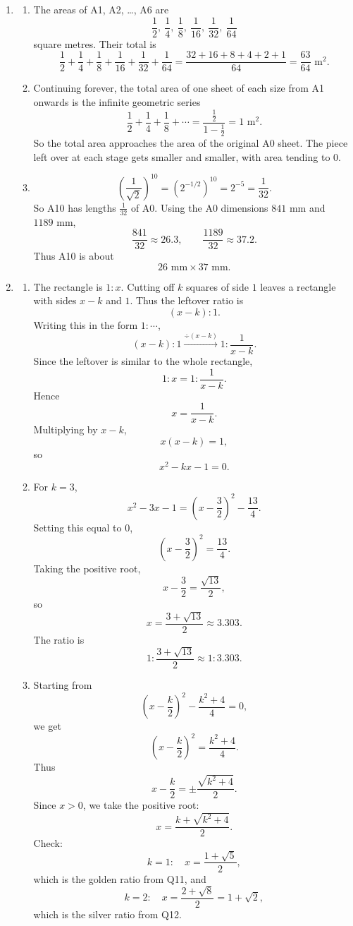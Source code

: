 \documentclass[11pt,a4paper]{article}
\begin{document}
\begin{enumerate}[label=\textbf{Q\arabic*.}, leftmargin=*, itemsep=1.2em]
\item
\begin{enumerate}[label=(\alph*)]
\item The areas of A1, A2, \ldots, A6 are
\[
\frac12,\ \frac14,\ \frac18,\ \frac1{16},\ \frac1{32},\ \frac1{64}
\]
square metres. Their total is
\[
\frac12+\frac14+\frac18+\frac1{16}+\frac1{32}+\frac1{64}
=
\frac{32+16+8+4+2+1}{64}
=
\frac{63}{64}\text{ m}^2.
\]

\item Continuing forever, the total area of one sheet of each size from A1 onwards is the infinite geometric series
\[
\frac12+\frac14+\frac18+\cdots
=
\frac{\frac12}{1-\frac12}
=1\text{ m}^2.
\]
So the total area approaches the area of the original A0 sheet. The piece left over at each stage gets smaller and smaller, with area tending to \(0\).

\item
\[
\left(\frac1{\sqrt2}\right)^{10}
=
\left(2^{-1/2}\right)^{10}
=
2^{-5}
=
\frac1{32}.
\]
So A10 has lengths \(\frac1{32}\) of A0. Using the A0 dimensions \(841\text{ mm}\) and \(1189\text{ mm}\),
\[
\frac{841}{32}\approx 26.3,
\qquad
\frac{1189}{32}\approx 37.2.
\]
Thus A10 is about
\[
26\text{ mm}\times 37\text{ mm}.
\]
\end{enumerate}

\item
\begin{enumerate}[label=(\alph*)]
\item The rectangle is \(1:x\). Cutting off \(k\) squares of side \(1\) leaves a rectangle with sides \(x-k\) and \(1\). Thus the leftover ratio is
\[
(x-k):1.
\]
Writing this in the form \(1:\cdots\),
\[
(x-k):1\xrightarrow{\div (x-k)}1:\frac1{x-k}.
\]
Since the leftover is similar to the whole rectangle,
\[
1:x=1:\frac1{x-k}.
\]
Hence
\[
x=\frac1{x-k}.
\]
Multiplying by \(x-k\),
\[
x(x-k)=1,
\]
so
\[
x^2-kx-1=0.
\]

\item For \(k=3\),
\[
x^2-3x-1=\left(x-\frac32\right)^2-\frac{13}{4}.
\]
Setting this equal to \(0\),
\[
\left(x-\frac32\right)^2=\frac{13}{4}.
\]
Taking the positive root,
\[
x-\frac32=\frac{\sqrt{13}}2,
\]
so
\[
x=\frac{3+\sqrt{13}}2\approx 3.303.
\]
The ratio is
\[
1:\frac{3+\sqrt{13}}2\approx 1:3.303.
\]

\item Starting from
\[
\left(x-\frac k2\right)^2-\frac{k^2+4}{4}=0,
\]
we get
\[
\left(x-\frac k2\right)^2=\frac{k^2+4}{4}.
\]
Thus
\[
x-\frac k2=\pm\frac{\sqrt{k^2+4}}2.
\]
Since \(x>0\), we take the positive root:
\[
x=\frac{k+\sqrt{k^2+4}}2.
\]
Check:
\[
k=1:\quad x=\frac{1+\sqrt5}{2},
\]
which is the golden ratio from Q11, and
\[
k=2:\quad x=\frac{2+\sqrt8}{2}=1+\sqrt2,
\]
which is the silver ratio from Q12.


\end{enumerate}
\end{enumerate}
\end{document}
